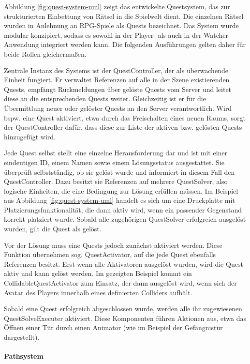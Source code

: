 Abbildung \ref{fig:quest-system-uml} zeigt das entwickelte Questsystem, das zur strukturierten Einbettung von Rätsel in die Spielwelt dient. Die einzelnen Rätsel wurden in Anlehnung an \ac{RPG}-Spiele als Quests bezeichnet. Das System wurde modular konzipiert, sodass es sowohl in der Player- als auch in der Watcher-Anwendung integriert werden kann. Die folgenden Ausführungen gelten daher für beide Rollen gleichermaßen.

Zentrale Instanz des Systems ist der QuestController, der als überwachende Einheit fungiert. Er verwaltet Referenzen auf alle in der Szene existierenden Quests, empfängt Rückmeldungen über gelöste Quests vom Server und leitet diese an die entsprechenden Quests weiter. Gleichzeitig ist er für die Übermittlung neuer oder gelöster Quests an den Server verantwortlich. Wird bspw. eine Quest aktiviert, etwa durch das Freischalten eines neuen Raums, sorgt der QuestController dafür, dass diese zur Liste der aktiven bzw. gelösten Quests hinzugefügt wird.

Jede Quest selbst stellt eine einzelne Herausforderung dar und ist mit einer eindeutigen ID, einem Namen sowie einem Lösungsstatus ausgestattet. Sie überprüft selbstständig, ob sie gelöst wurde und informiert in diesem Fall den QuestController. Dazu besitzt sie Referenzen auf mehrere QuestSolver, also logische Einheiten, die eine Bedingung zur Lösung erfüllen müssen. Im Beispiel aus Abbildung \ref{fig:quest-system-uml} handelt es sich um eine Druckplatte mit Platzierungsfunktionalität, die dann aktiv wird, wenn ein passender Gegenstand korrekt platziert wurde. Sobald alle zugehörigen QuestSolver erfolgreich ausgelöst wurden, gilt die Quest als gelöst.

Vor der Lösung muss eine Quests jedoch zunächst aktiviert werden. Diese Funktion übernehmen sog. QuestActivator, auf die jede Quest ebenfalls Referenzen besitzt. Erst wenn alle Aktivatoren ausgelöst wurden, wird die Quest aktiv und kann gelöst werden. Im gezeigten Beispiel kommt ein CollidableQuestActivator zum Einsatz, der dann ausgelöst wird, wenn sich der Avatar des Players innerhalb eines definierten Colliders aufhält.

Sobald eine Quest erfolgreich abgeschlossen wurde, werden alle ihr zugewiesenen QuestSolveExecuter aktiviert. Diese Komponenten führen Aktionen aus, etwa das Öffnen einer Tür durch einen Animator (wie im Beispiel der Gefängnistür dargestellt).

\paragraph{Pathsystem}\label{sec:path-system}


